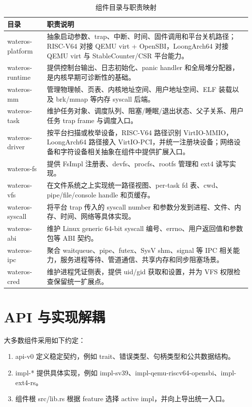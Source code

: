 \documentclass[12pt,openany,oneside,AutoFakeBold=true]{ctexbook}
\newcommand{\code}[1]{\textnormal{\rmfamily #1}}
\newcommand{\syscall}[1]{\textnormal{\rmfamily #1}}
\begin{document}
\begin{longtable}{>{\raggedright\arraybackslash}p{4.0cm}>{\raggedright\arraybackslash}p{9.5cm}}
  \caption{组件目录与职责映射}\label{tab:component-dirs}\\
  \toprule[1.5pt]
  目录 & 职责说明 \\
  \midrule[1pt]
  \code{wateros-platform} & 抽象启动参数、trap、中断、时间、固件调用和平台关机路径；RISC-V64 对接 QEMU virt + OpenSBI，LoongArch64 对接 QEMU virt 与 StableCounter/CSR 平台能力。 \\
  \code{wateros-runtime} & 提供控制台输出、日志初始化、panic handler 和全局堆分配器，是内核早期可诊断性的基础。 \\
  \code{wateros-mm} & 管理物理帧、页表、内核地址空间、用户地址空间、ELF 装载以及 \syscall{brk}/\syscall{mmap} 等内存 syscall 后端。 \\
  \code{wateros-task} & 维护任务对象、调度队列、阻塞/睡眠/退出状态、父子关系、用户任务 trap frame 与调度入口。 \\
\code{wateros-driver} & 按平台扫描或枚举设备，RISC-V64 路径识别 VirtIO-MMIO，LoongArch64 路径接入 VirtIO-PCI，并统一注册块设备；网络设备和字符设备相关抽象在组件中提供扩展入口。 \\
  \code{wateros-fs} & 提供 \code{FsImpl} 注册表、devfs、procfs、rootfs 管理和 ext4 读写实现。 \\
  \code{wateros-vfs} & 在文件系统之上实现统一路径视图、per-task fd 表、cwd、pipe/file/console handle 和页缓存。 \\
  \code{wateros-syscall} & 将平台 trap 传入的 syscall number 和参数分发到进程、文件、内存、时间、网络等具体实现。 \\
  \code{wateros-abi} & 维护 Linux generic 64-bit syscall 编号、errno、用户返回值和参数包等 ABI 契约。 \\
\code{wateros-ipc} & 聚合 waitqueue、pipe、futex、SysV shm、signal 等 IPC 相关能力，服务进程等待、管道通信、共享内存和同步阻塞场景。 \\
\code{wateros-cred} & 维护进程凭证侧表，提供 uid/gid 获取和设置，并为 VFS 权限检查保留统一扩展点。 \\
  \bottomrule[1.5pt]
\end{longtable}

\section{API 与实现解耦}

大多数组件采用如下约定：

\begin{enumerate}
  \item \code{api-v0} 定义稳定契约，例如 trait、错误类型、句柄类型和公共数据结构。
  \item \code{impl-*} 提供具体实现，例如 \code{impl-sv39}、\code{impl-qemu-riscv64-opensbi}、\code{impl-ext4-rs}。
  \item 组件根 \code{src/lib.rs} 根据 feature 选择 active impl，并向上导出统一入口。
\end{enumerate}
\end{document}
